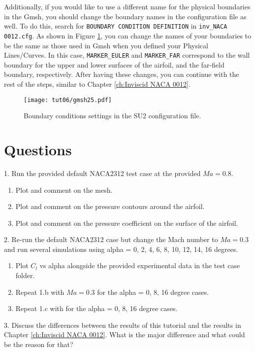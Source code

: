 Additionally, if you would like to use a different name for the physical boundaries in the Gmsh, you should change the boundary names in the configuration file as well. To do this, search for \texttt{BOUNDARY CONDITION DEFINITION} in \texttt{inv\_NACA 0012.cfg}. As shown in Figure \ref{fig6:gmsh25}, you can change the names of your boundaries to be the same as those used in Gmsh when you defined your Physical Lines/Curves. In this case, \texttt{MARKER\_EULER} and \texttt{MARKER\_FAR} correspond to the wall boundary for the upper and lower surfaces of the airfoil, and the far-field boundary, respectively. After having these changes, you can continue with the rest of the steps, similar to Chapter \ref{ch:Inviscid NACA 0012}.
\begin{figure}[ht]
    \centering
    \texttt{[image: tut06/gmsh25.pdf]}
    \caption{Boundary conditions settings in the SU2 configuration file.}
    \label{fig6:gmsh25}
\end{figure}
\section*{Questions}
1. Run the provided default NACA2312 test case at the provided $Ma = 0.8$.
\begin{enumerate}[label=(\alph*)]
    \item Plot and comment on the mesh.
    \item Plot and comment on the pressure contours around the airfoil.
    \item Plot and comment on the pressure coefficient on the surface of the airfoil.
\end{enumerate}
2. Re-run the default NACA2312 case but change the Mach number to $Ma = 0.3$ and run several simulations using alpha = 0, 2, 4, 6, 8, 10, 12, 14, 16 degrees.
\begin{enumerate}[label=(\alph*)]
    \item Plot $C_l$ vs alpha alongside the provided experimental data\cite{ladson1988effects} in the test case folder.
    \item Repeat 1.b with $Ma = 0.3$ for the alpha = 0, 8, 16 degree cases.
    \item Repeat 1.c with for the alpha = 0, 8, 16 degree cases.
\end{enumerate}
3. Discuss the differences between the results of this tutorial and the results in Chapter \ref{ch:Inviscid NACA 0012}. What is the major difference and what could be the reason for that?
